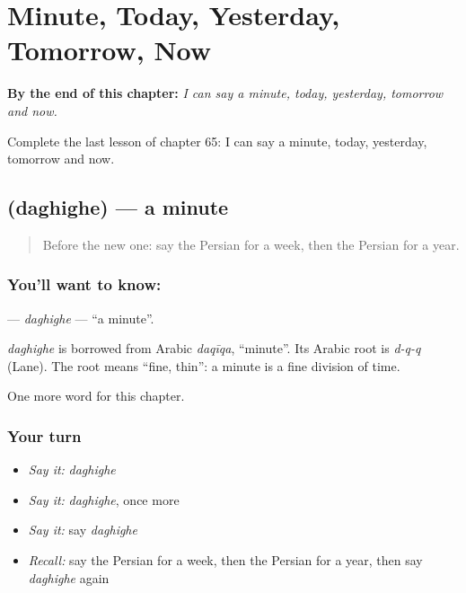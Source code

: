 
\chapter{Minute, Today, Yesterday, Tomorrow, Now}
\label{ch:fa-minute-today-yesterday-tomorrow-now}

\begin{chapteropening}
\textbf{By the end of this chapter:} \emph{I can say a minute, today, yesterday, tomorrow and now.}

Complete the last lesson of chapter 65: I can say a minute, today, yesterday, tomorrow and now.
\end{chapteropening}

\section[\texorpdfstring{\fa{دقیقه} (daghighe)}{دقیقه (daghighe)}]{ (daghighe) — a minute}

\label{lesson:FA-C65-daghighe}



\begin{quote}
Before the new one: say the Persian for a week, then the Persian for a year.
\end{quote}

\subsection*{You'll want to know: }
\textbf{} — \emph{daghighe} — \textquotedblleft{}a minute\textquotedblright{}.

\begin{cousinweb}
\emph{daghighe} is borrowed from Arabic \emph{daqīqa}, \textquotedblleft{}minute\textquotedblright{}. Its Arabic root is \emph{d-q-q} (Lane). The root means \textquotedblleft{}fine, thin\textquotedblright{}: a minute is a fine division of time.
\end{cousinweb}

\begin{grammarlens}[title={What you've built}]
One more word for this chapter.
\end{grammarlens}

\subsection*{Your turn}
\begin{itemize}
\raggedright
  \item \emph{Say it:} \emph{daghighe}
  \item \emph{Say it:} \emph{daghighe}, once more
  \item \emph{Say it:} say \emph{daghighe}
  \item \emph{Recall:} say the Persian for a week, then the Persian for a year, then say \emph{daghighe} again
\end{itemize}

